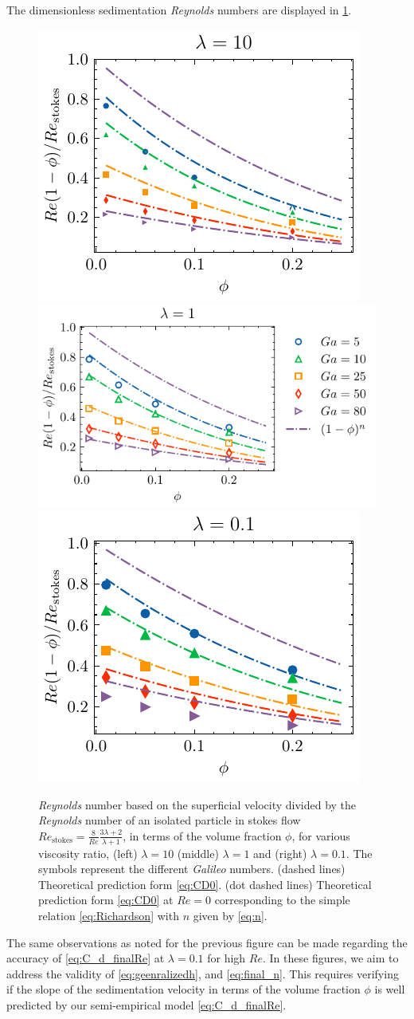 The dimensionless sedimentation \textit{Reynolds} numbers are displayed in \ref{fig:Reasim}. 
\begin{figure}[h!]
    \centering
    \includegraphics[height = 0.23\textwidth]{image/HOMOGENEOUS_final/CA/U_l_10.pdf}
    \includegraphics[height = 0.23\textwidth]{image/HOMOGENEOUS_final/CA/U_l_1.pdf}
    \includegraphics[height = 0.23\textwidth]{image/HOMOGENEOUS_final/CA/U_l_0.pdf}
    \caption{
        \textit{Reynolds} number based on the superficial velocity divided by the \textit{Reynolds} number of an isolated particle in stokes flow $Re_\text{stokes}= \frac{8}{Re} \frac{3\lambda +2}{\lambda+1}$, in terms of the volume fraction $\phi$, for various viscosity ratio, (left) $\lambda  = 10$ (middle) $\lambda =1$ and (right) $\lambda = 0.1$. 
        The symbols represent the different \textit{Galileo} numbers. 
        (dashed lines) Theoretical prediction form \ref{eq:CD0}. 
        (dot dashed lines) Theoretical prediction form \ref{eq:CD0} at $Re = 0$ corresponding to the simple relation \ref{eq:Richardson} with $n$ given by \ref{eq:n}. 
    }
    \label{fig:Reasim}
\end{figure}
The same observations as noted for the previous figure can be made regarding the accuracy of \ref{eq:C_d_finalRe} at $\lambda = 0.1$ for high $Re$. 
In these figures, we aim to address the validity of \ref{eq:geenralizedh}, and \ref{eq:final_n}. 
This requires verifying if the slope of the sedimentation velocity in terms of the volume fraction $\phi$ is well predicted by our semi-empirical model \eqref{eq:C_d_finalRe}. 

